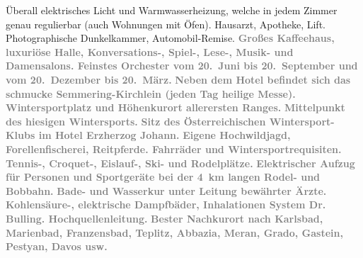 \begin{ledgroupsized}[t]{13cm}
{{                        Überall elektrisches Licht und Warmwasserheizung, welche in jedem Zimmer
                        genau regulierbar (auch Wohnungen mit Öfen). Hausarzt, Apotheke, Lift.
                        Photographische Dunkelkammer, Automobil-Remise.}}\pend
           \pstart
           \noindent{}\centering{}\textcolor{gray}{\textbf{Großes Kaffeehaus, luxuriöse Halle, Konversations-, Spiel-,
                        Lese-, Musik- und Damensalons. Feinstes Orchester vom 20. Juni bis
                        20. September und vom 20. Dezember bis 20. März.}}\pend
           \pstart
           \noindent{}\centering{}\textcolor{gray}{\textbf{Neben dem Hotel befindet sich das schmucke Semmering-Kirchlein (jeden Tag heilige Messe).}}\pend
           \pstart
           \noindent{}\centering{}\textcolor{gray}{\textbf{Wintersportplatz und Höhenkurort allerersten Ranges.}}\pend
           \pstart
           \noindent{}\centering{}\textcolor{gray}{\textbf{Mittelpunkt des hiesigen Wintersports.}}\pend
           \pstart
           \noindent{}\centering{}\textcolor{gray}{\textbf{Sitz des Österreichischen
                            Wintersport-Klubs im Hotel Erzherzog
                            Johann.}}\pend
           \pstart
           \noindent{}\centering{}\textcolor{gray}{\textbf{Eigene Hochwildjagd, Forellenfischerei, Reitpferde.
                        Fahrräder und Wintersportrequisiten.}}\pend
           \pstart
           \noindent{}\centering{}\textcolor{gray}{\textbf{Tennis-, Croquet-, Eislauf-, Ski- und Rodelplätze.}}\pend
           \pstart
           \noindent{}\centering{}\textcolor{gray}{\textbf{Elektrischer Aufzug für Personen und Sportgeräte bei der
                        4 km langen Rodel- und Bobbahn.}}\pend
           \pstart
           \noindent{}\centering{}\textcolor{gray}{\textbf{Bade- und Wasserkur unter Leitung bewährter Ärzte.
                        Kohlensäure-, elektrische Dampfbäder, Inhalationen System Dr. Bulling. Hochquellenleitung.}}\pend
           \pstart
           \noindent{}\centering{}\textcolor{gray}{\textbf{Bester Nachkurort nach Karlsbad, Marienbad, Franzensbad, Teplitz, Abbazia, Meran, Grado, Gastein, Pestyan, Davos usw.
}}
\end{ledgroupsized}
